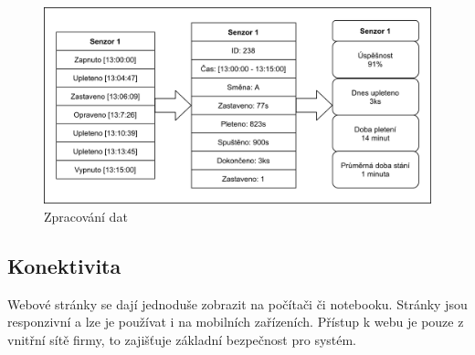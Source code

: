 \begin{figure}[htbp]
    \centering
    \includegraphics[width=\textwidth]{img/Princip.png}
    \caption{Zpracování dat}
    \label{fig:princip}
\end{figure}

\subsection{Konektivita}
Webové stránky se dají jednoduše zobrazit na počítači či notebooku.
Stránky jsou responzivní a lze je používat i na mobilních zařízeních.
Přístup k webu je pouze z vnitřní sítě firmy, to zajišťuje základní bezpečnost pro systém.


\newpage